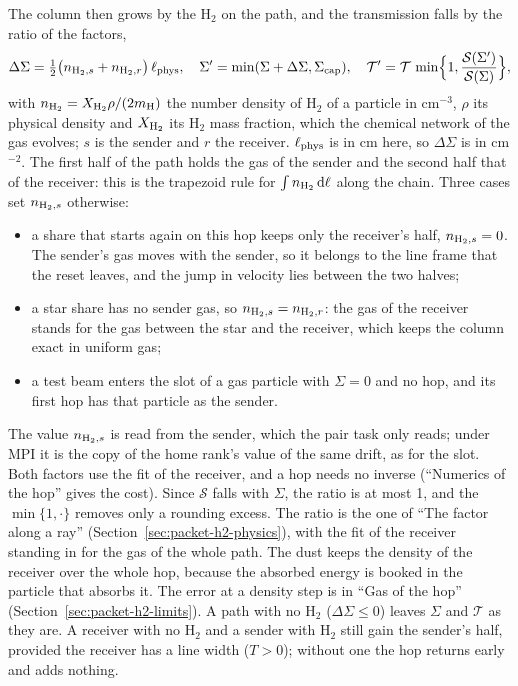 The column then grows by the H$_2$ on the path, and the transmission falls by
the ratio of the factors,
\begin{equation}
  \Delta\Sigma = \tfrac12\big(n_{{\rm H}_2,s}+n_{{\rm H}_2,r}\big)\,\ell_{\rm phys}, \quad
  \Sigma' = \min(\Sigma+\Delta\Sigma,\Sigma_{\rm cap}), \quad
  \mathcal T' = \mathcal T\,\min\!\Big\{1,\frac{\mathcal S(\Sigma')}{\mathcal S(\Sigma)}\Big\},
  \label{eq:h2-hop}
\end{equation}
with $n_{{\rm H}_2}=X_{{\rm H}_2}\rho/(2m_{\rm H})$ the number density of H$_2$
of a particle in cm$^{-3}$, $\rho$ its physical density and $X_{{\rm H}_2}$
its H$_2$ mass fraction, which the chemical network of the gas evolves;
$s$ is the sender and $r$ the receiver. $\ell_{\rm phys}$ is in cm here, so
$\Delta\Sigma$ is in cm$^{-2}$. The first half of the path holds the gas of
the sender and the second half that of the receiver: this is the trapezoid
rule for $\int n_{{\rm H}_2}\,{\rm d}\ell$ along the chain. Three cases set
$n_{{\rm H}_2,s}$ otherwise:
\begin{itemize}
  \item a share that starts again on this hop keeps only the receiver's half,
    $n_{{\rm H}_2,s}=0$. The sender's gas moves with the sender, so it belongs
    to the line frame that the reset leaves, and the jump in velocity lies
    between the two halves;
  \item a star share has no sender gas, so $n_{{\rm H}_2,s}=n_{{\rm H}_2,r}$:
    the gas of the receiver stands for the gas between the star and the
    receiver, which keeps the column exact in uniform gas;
  \item a test beam enters the slot of a gas particle with $\Sigma=0$ and no
    hop, and its first hop has that particle as the sender.
\end{itemize}
The value $n_{{\rm H}_2,s}$ is read from the sender, which the pair task only
reads; under MPI it is the copy of the home rank's value of the same drift,
as for the slot. Both factors use the fit of the receiver, and a hop needs no
inverse (``Numerics of the hop'' gives the cost). Since $\mathcal S$ falls with
$\Sigma$, the ratio is at most 1, and the $\min\{1,\cdot\}$ removes only a
rounding excess. The ratio is the one of ``The factor along a ray''
(Section~\ref{sec:packet-h2-physics}), with the fit of the receiver standing in
for the gas of the whole path. The dust keeps the density of the receiver over the
whole hop, because the absorbed energy is booked in the particle that absorbs
it. The error at a density step is in ``Gas of the hop''
(Section~\ref{sec:packet-h2-limits}). A path with no H$_2$
($\Delta\Sigma\le0$) leaves $\Sigma$ and $\mathcal T$ as they are. A receiver
with no H$_2$ and a sender with H$_2$ still gain the sender's half, provided the
receiver has a line width ($T>0$); without one the hop returns early and adds
nothing.

